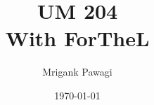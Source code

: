\documentclass{article}
\title{UM 204 \\
{\Large With ForTheL}}
\author{Mrigank Pawagi}
\date{\today}
\begin{document}
\maketitle
\tableofcontents
\pagebreak


\pagebreak


\end{document}
